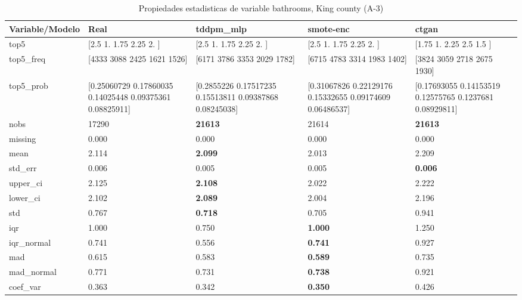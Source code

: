\begin{table}[H]
\centering
\fontsize{8}{14}\selectfont
\caption{Propiedades  estadisticas de variable bathrooms, King county (A-3)}
\label{table-stats-king county-a-3-bathrooms}
\begin{tabular}{|l|m{10em}|m{10em}|m{10em}|m{10em}|}
\hline
 \rowcolor[gray]{0.8}
Variable/Modelo & Real & tddpm\_mlp & smote-enc & ctgan \\
\hline top5 & [2.5  1.   1.75 2.25 2.  ] & [2.5  1.   1.75 2.25 2.  ] & [2.5  1.   1.75 2.25 2.  ] & [1.75 1.   2.25 2.5  1.5 ] \\
\hline top5\_freq & [4333 3088 2425 1621 1526] & [6171 3786 3353 2029 1782] & [6715 4783 3314 1983 1402] & [3824 3059 2718 2675 1930] \\
\hline top5\_prob & [0.25060729 0.17860035 0.14025448 0.09375361 0.08825911] & [0.2855226  0.17517235 0.15513811 0.09387868 0.08245038] & [0.31067826 0.22129176 0.15332655 0.09174609 0.06486537] & [0.17693055 0.14153519 0.12575765 0.1237681  0.08929811] \\
\hline nobs & 17290 & \bfseries 21613 & \cellcolor[rgb]{0.9, 0.54, 0.52} 21614 & \bfseries 21613 \\
\hline missing & 0.000 & 0.000 & 0.000 & 0.000 \\
\hline mean & 2.114 & \bfseries 2.099 & \cellcolor[rgb]{0.9, 0.54, 0.52} 2.013 & 2.209 \\
\hline std\_err & 0.006 & 0.005 & \cellcolor[rgb]{0.9, 0.54, 0.52} 0.005 & \bfseries 0.006 \\
\hline upper\_ci & 2.125 & \bfseries 2.108 & \cellcolor[rgb]{0.9, 0.54, 0.52} 2.022 & 2.222 \\
\hline lower\_ci & 2.102 & \bfseries 2.089 & \cellcolor[rgb]{0.9, 0.54, 0.52} 2.004 & 2.196 \\
\hline std & 0.767 & \bfseries 0.718 & 0.705 & \cellcolor[rgb]{0.9, 0.54, 0.52} 0.941 \\
\hline iqr & 1.000 & \cellcolor[rgb]{0.9, 0.54, 0.52} 0.750 & \bfseries 1.000 & \cellcolor[rgb]{0.9, 0.54, 0.52} 1.250 \\
\hline iqr\_normal & 0.741 & \cellcolor[rgb]{0.9, 0.54, 0.52} 0.556 & \bfseries 0.741 & \cellcolor[rgb]{0.9, 0.54, 0.52} 0.927 \\
\hline mad & 0.615 & 0.583 & \bfseries 0.589 & \cellcolor[rgb]{0.9, 0.54, 0.52} 0.735 \\
\hline mad\_normal & 0.771 & 0.731 & \bfseries 0.738 & \cellcolor[rgb]{0.9, 0.54, 0.52} 0.921 \\
\hline coef\_var & 0.363 & 0.342 & \bfseries 0.350 & \cellcolor[rgb]{0.9, 0.54, 0.52} 0.426 \\

\end{tabular}
\end{table}
